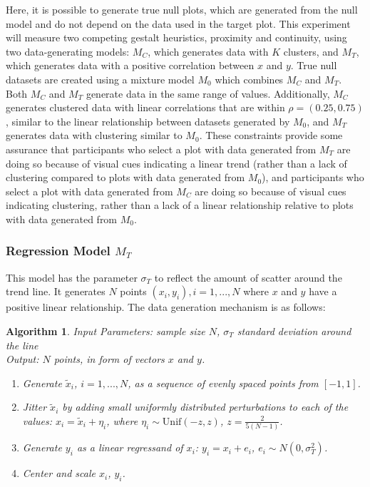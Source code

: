 \documentclass[11pt]{isuthesis}\usepackage[]{graphicx}\usepackage[]{color}
\newtheorem{algorithm}[theorem]{Algorithm}
\begin{document}
Here, it is possible to generate true null plots, which are generated from the null model and do not depend on the data used in the target plot. 
This experiment will measure two competing gestalt heuristics, proximity and continuity, using two data-generating models: $M_C$, which generates data with $K$ clusters, and $M_T$, which generates data with a positive correlation between $x$ and $y$. 
True null datasets are created using a mixture model $M_0$ which combines $M_C$ and $M_T$. Both $M_C$ and $M_T$ generate data in the same range of values. 
Additionally, $M_C$ generates clustered data with linear correlations that are within $\rho = (0.25, 0.75)$, similar to the linear relationship between datasets generated by $M_0$, and $M_T$ generates data with clustering similar to $M_0$. These constraints provide some assurance that participants who select a plot with data generated from $M_T$ are doing so because of visual cues indicating a linear trend (rather than a lack of clustering compared to plots with data generated from $M_0$), and participants who select a plot with data generated from $M_C$ are doing so because of visual cues indicating clustering, rather than a lack of a linear relationship relative to plots with data generated from $M_0$. 


\subsubsection{Regression Model $M_T$}
This model has the parameter $\sigma_T$ to reflect the amount of scatter around the trend line. It generates $N$ points $(x_i, y_i), i=1, ..., N$ where $x$ and $y$ have a positive linear relationship. The data generation mechanism is as follows: 

\begin{algorithm}\hfill\newline
  Input Parameters: sample size $N$, $\sigma_T$ standard deviation around the line \\
  Output: $N$ points, in form of vectors $x$ and $y$.
  \begin{enumerate}
    \item Generate $\tilde{x}_i$, $i=1, ..., N$, as a sequence of evenly spaced points from $[-1, 1]$. 
    \item Jitter $\tilde{x}_i$ by adding small uniformly distributed perturbations to each of the values: $x_i = \tilde{x}_i + \eta_i$, where $\eta_i \sim \text{Unif}(-z, z)$, $z = \frac{2}{5(N-1)}$.
    \item Generate $y_i$ as a linear regressand of $x_i$: $y_i = x_i + e_i$, $e_i \sim N(0, \sigma^2_T)$.
    \item Center and scale $x_i$, $y_i$.
  \end{enumerate}
\end{algorithm}
\end{document}
